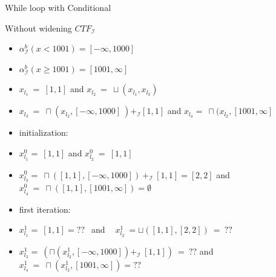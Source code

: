 \begin{frame}{While loop with Conditional}
\begin{exampleblock}{Without widening $CTF_\mathcal{I}$}
  \centering 
		\begin{itemize}
		\item $\alpha_{\scriptscriptstyle \mathcal{I}}^{\scriptscriptstyle b} ( x < 1001) = [-\infty,1000]$
		\item $\alpha_{\scriptscriptstyle \mathcal{I}}^{\scriptscriptstyle b} ( x \geq 1001) = [1001,\infty]$
		\item $x_{l_1}~=~ [1,1]$ and  $x_{l_2}~=~ \sqcup(x_{l_1},x_{l_3})$
		\item $x_{l_3}~=~ \sqcap(x_{l_2},[-\infty,1000]~) +_\mathcal{I} [1,1]$ and  $x_{l_4} =~\sqcap(x_{l_2},[1001,\infty] $
		\item initialization:
		\item $x_{l_1}^0=~ [1,1]$  and $x_{l_2}^0~=~ [1,1]$\\
		\item $x_{l_3}^0=~ \sqcap([1,1],[-\infty,1000]) ~+_\mathcal{I}~ [1,1] = [2,2]$  and $x_{l_4}^0~=~ \sqcap([1,1],[1001,\infty]) =\emptyset $\\
		\item first iteration:
		\item $x_{l_1}^1=~ [1,1]= ??~~$  and $~~~~x_{l_2}^1~=\sqcup([1,1],[2,2])~=~??$\\
		\item $x_{l_3}^1=~ (\sqcap(x_{l_2}^1,[-\infty,1000]) +_\mathcal{I} ~[1,1]) ~= ~??$  and $x_{l_4}^1~=~ \sqcap(x_{l_2}^1,[1001,\infty]) = ?? $\\
	\end{itemize}
\end{exampleblock}
\end{frame}

